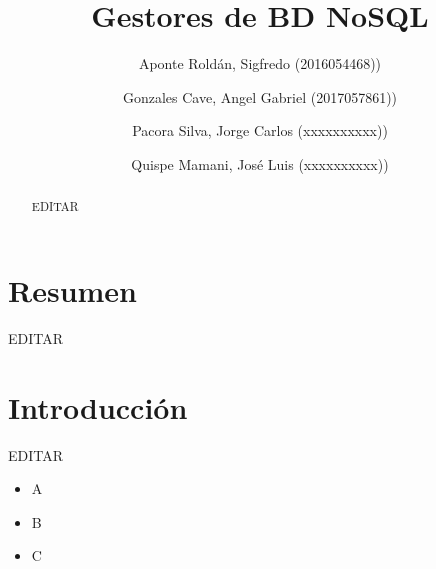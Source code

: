 \documentclass[preprint,12pt]{elsarticle}
\begin{document}
	
	\begin{frontmatter}

		\title{\huge Gestores de BD NoSQL}
		
		\author{Aponte Roldán, Sigfredo              		(2016054468))}
		\author{Gonzales Cave, Angel Gabriel              	(2017057861))} %
		\author{Pacora Silva, Jorge Carlos         		(xxxxxxxxxx))} %
		\author{Quispe Mamani, José Luis             		(xxxxxxxxxx))} %
		\address{Tacna, Perú}
		

		\begin{abstract}
		
EDITAR

		\end{abstract}


	\end{frontmatter}


	\section{Resumen}

EDITAR




\section{Introducción} 

EDITAR

\begin{itemize}
\item A
\item B
\item C


\end{itemize}
\end{document}
